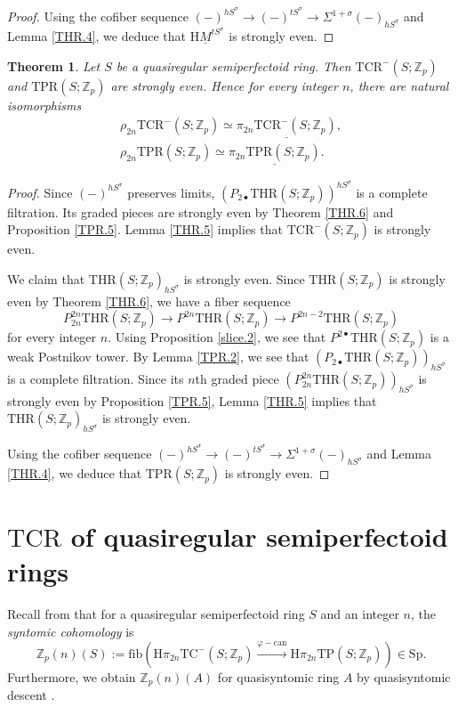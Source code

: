 \documentclass[10pt]{amsart}
\newtheorem{thm}{Theorem}[section]
\theoremstyle{definition}
\numberwithin{equation}{section}
\newcommand{\Z}{\mathbb{Z}}
\newcommand{\rH}{\mathrm{H}}
\newcommand{\ul}{\underline}
\newcommand{\Sp}{\mathrm{Sp}}
\newcommand{\fib}{\mathrm{fib}}
\newcommand{\can}{\mathrm{can}}
\newcommand{\TPR}{\mathrm{TPR}}
\newcommand{\THR}{\mathrm{THR}}
\newcommand{\TC}{\mathrm{TC}}
\newcommand{\TP}{\mathrm{TP}}
\newcommand{\TCR}{\mathrm{TCR}}
\begin{document}
{\begin{proof}
Using the cofiber sequence $(-)^{hS^\sigma}\to (-)^{tS^\sigma}\to \Sigma^{1+\sigma}(-)_{hS^\sigma}$ and Lemma \ref{THR.4},
we deduce that $\rH \ul{M}^{tS^\sigma}$ is strongly even.
\end{proof}


\begin{thm}
\label{TPR.7}
Let $S$ be a quasiregular semiperfectoid ring.
Then $\TCR^-(S;\Z_p)$ and $\TPR(S;\Z_p)$ are strongly even.
Hence for every integer $n$,
there are natural isomorphisms
\begin{gather*}
\rho_{2n}\TCR^-(S;\Z_p)
\simeq
\ul{\pi_{2n}\TCR^-(S;\Z_p)},
\\
\rho_{2n}\TPR(S;\Z_p)
\simeq
\ul{\pi_{2n}\TPR(S;\Z_p)}.
\end{gather*}
\end{thm}
\begin{proof}
Since $(-)^{hS^\sigma}$ preserves limits,
$(P_{2\bullet} \THR(S;\Z_p))^{hS^\sigma}$ is a complete filtration.
Its graded pieces are strongly even by Theorem \ref{THR.6} and Proposition \ref{TPR.5}.
Lemma \ref{THR.5} implies that $\TCR^-(S;\Z_p)$ is strongly even.

We claim that $\THR(S;\Z_p)_{hS^\sigma}$ is strongly even.
Since $\THR(S;\Z_p)$ is strongly even by Theorem \ref{THR.6},
we have a fiber sequence
\[
P_{2n}^{2n}\THR(S;\Z_p)
\to
P^{2n}\THR(S;\Z_p)
\to
P^{2n-2}\THR(S;\Z_p)
\]
for every integer $n$.
Using Proposition \ref{slice.2},
we see that $P^{2\bullet}\THR(S;\Z_p)$ is a weak Postnikov tower.
By Lemma \ref{TPR.2},
we see that $(P_{2\bullet}\THR(S;\Z_p))_{hS^\sigma}$ is a complete filtration.
Since its $n$th graded piece $(P_{2n}^{2n}\THR(S;\Z_p))_{hS^\sigma}$ is strongly even by Proposition \ref{TPR.5},
Lemma \ref{THR.5} implies that $\THR(S;\Z_p)_{hS^\sigma}$ is strongly even.

Using the cofiber sequence $(-)^{hS^\sigma}\to (-)^{tS^\sigma}\to \Sigma^{1+\sigma}(-)_{hS^\sigma}$ and Lemma \ref{THR.4},
we deduce that $\TPR(S;\Z_p)$ is strongly even.
\end{proof}



\section{\texorpdfstring{$\TCR$}{TCR} of quasiregular semiperfectoid rings}\label{TCR}

Recall from \cite[\S 7.4]{BMS19} that for a quasiregular semiperfectoid ring $S$ and an integer $n$,
the \emph{syntomic cohomology} is
\[
\Z_p(n)(S)
:=
\fib(\rH \pi_{2n}\TC^-(S;\Z_p)
\xrightarrow{\varphi-\can}
\rH \pi_{2n}\TP(S;\Z_p))
\in \Sp.
\]
Furthermore,
we obtain 
$\Z_p(n)(A)$ for quasisyntomic ring $A$ by quasisyntomic descent \cite[Proposition 4.31]{BMS19}.



}
\end{document}
